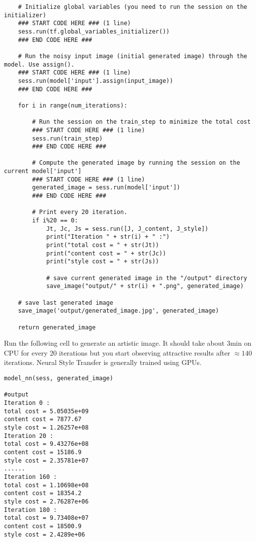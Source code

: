 {\begin{verbatim}
    # Initialize global variables (you need to run the session on the initializer)
    ### START CODE HERE ### (1 line)
    sess.run(tf.global_variables_initializer())
    ### END CODE HERE ###
    
    # Run the noisy input image (initial generated image) through the model. Use assign().
    ### START CODE HERE ### (1 line)
    sess.run(model['input'].assign(input_image))
    ### END CODE HERE ###
    
    for i in range(num_iterations):
    
        # Run the session on the train_step to minimize the total cost
        ### START CODE HERE ### (1 line)
        sess.run(train_step)
        ### END CODE HERE ###
        
        # Compute the generated image by running the session on the current model['input']
        ### START CODE HERE ### (1 line)
        generated_image = sess.run(model['input'])
        ### END CODE HERE ###

        # Print every 20 iteration.
        if i%20 == 0:
            Jt, Jc, Js = sess.run([J, J_content, J_style])
            print("Iteration " + str(i) + " :")
            print("total cost = " + str(Jt))
            print("content cost = " + str(Jc))
            print("style cost = " + str(Js))
            
            # save current generated image in the "/output" directory
            save_image("output/" + str(i) + ".png", generated_image)
    
    # save last generated image
    save_image('output/generated_image.jpg', generated_image)
    
    return generated_image
\end{verbatim}

Run the following cell to generate an artistic image. It should take about 3min on CPU for every 20 iterations but you start observing attractive results after $\approx 140$ iterations. Neural Style Transfer is generally trained using GPUs.
\begin{verbatim}
model_nn(sess, generated_image)

#output
Iteration 0 :
total cost = 5.05035e+09
content cost = 7877.67
style cost = 1.26257e+08
Iteration 20 :
total cost = 9.43276e+08
content cost = 15186.9
style cost = 2.35781e+07
......
Iteration 160 :
total cost = 1.10698e+08
content cost = 18354.2
style cost = 2.76287e+06
Iteration 180 :
total cost = 9.73408e+07
content cost = 18500.9
style cost = 2.4289e+06
\end{verbatim}


}
